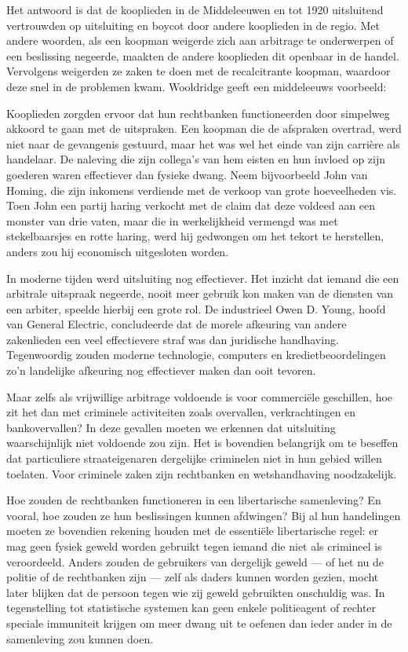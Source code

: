\documentclass[
  a5paper,
  smalldemyvopaper,10pt,twoside,onecolumn,openright,extrafontsizes,hidelinks]{memoir}
\renewenvironment{quote}%
               {\list{}{\rightmargin=.6cm\leftmargin=.6cm}%
                \itshape \item[]}%
               {\endlist}
\begin{document}
Het antwoord is dat de kooplieden in de Middeleeuwen en tot 1920
uitsluitend vertrouwden op uitsluiting en boycot door andere kooplieden
in de regio. Met andere woorden, als een koopman weigerde zich aan
arbitrage te onderwerpen of een beslissing negeerde, maakten de andere
kooplieden dit openbaar in de handel. Vervolgens weigerden ze zaken te
doen met de recalcitrante koopman, waardoor deze snel in de problemen
kwam. Wooldridge geeft een middeleeuws voorbeeld:

\begin{quote}
Kooplieden zorgden ervoor dat hun rechtbanken functioneerden door
simpelweg akkoord te gaan met de uitspraken. Een koopman die de
afspraken overtrad, werd niet naar de gevangenis gestuurd, maar het was
wel het einde van zijn carrière als handelaar. De naleving die zijn
collega's van hem eisten en hun invloed op zijn goederen waren
effectiever dan fysieke dwang. Neem bijvoorbeeld John van Homing, die
zijn inkomens verdiende met de verkoop van grote hoeveelheden vis. Toen
John een partij haring verkocht met de claim dat deze voldeed aan een
monster van drie vaten, maar die in werkelijkheid vermengd was met
stekelbaarsjes en rotte haring, werd hij gedwongen om het tekort te
herstellen, anders zou hij economisch uitgesloten worden.
\end{quote}

In moderne tijden werd uitsluiting nog effectiever. Het inzicht dat
iemand die een arbitrale uitspraak negeerde, nooit meer gebruik kon
maken van de diensten van een arbiter, speelde hierbij een grote rol. De
industrieel Owen D. Young, hoofd van General Electric, concludeerde dat
de morele afkeuring van andere zakenlieden een veel effectievere straf
was dan juridische handhaving. Tegenwoordig zouden moderne technologie,
computers en kredietbeoordelingen zo'n landelijke afkeuring nog
effectiever maken dan ooit tevoren.

Maar zelfs als vrijwillige arbitrage voldoende is voor commerciële
geschillen, hoe zit het dan met criminele activiteiten zoals overvallen,
verkrachtingen en bankovervallen? In deze gevallen moeten we erkennen
dat uitsluiting waarschijnlijk niet voldoende zou zijn. Het is bovendien
belangrijk om te beseffen dat particuliere straateigenaren dergelijke
criminelen niet in hun gebied willen toelaten. Voor criminele zaken zijn
rechtbanken en wetshandhaving noodzakelijk.

Hoe zouden de rechtbanken functioneren in een libertarische samenleving?
En vooral, hoe zouden ze hun beslissingen kunnen afdwingen? Bij al hun
handelingen moeten ze bovendien rekening houden met de essentiële
libertarische regel: er mag geen fysiek geweld worden gebruikt tegen
iemand die niet als crimineel is veroordeeld. Anders zouden de
gebruikers van dergelijk geweld --- of het nu de politie of de
rechtbanken zijn --- zelf als daders kunnen worden gezien, mocht later
blijken dat de persoon tegen wie zij geweld gebruikten onschuldig was.
In tegenstelling tot statistische systemen kan geen enkele politieagent
of rechter speciale immuniteit krijgen om meer dwang uit te oefenen dan
ieder ander in de samenleving zou kunnen doen.
\end{document}
